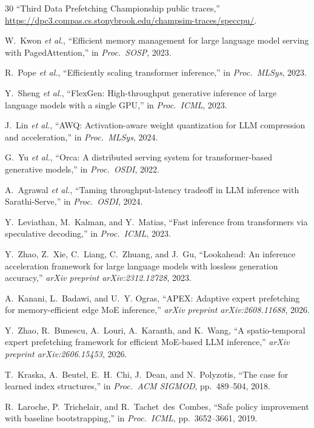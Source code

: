 \documentclass[conference]{IEEEtran}
\begin{document}
\begin{thebibliography}{30}
``Third Data Prefetching Championship public traces,''
\url{https://dpc3.compas.cs.stonybrook.edu/champsim-traces/speccpu/}.

W.~Kwon \emph{et al.},
``Efficient memory management for large language model serving with {PagedAttention},''
in \emph{Proc.\ SOSP}, 2023.

R.~Pope \emph{et al.},
``Efficiently scaling transformer inference,''
in \emph{Proc.\ MLSys}, 2023.

Y.~Sheng \emph{et al.},
``{FlexGen}: High-throughput generative inference of large language models with a single {GPU},''
in \emph{Proc.\ ICML}, 2023.

J.~Lin \emph{et al.},
``{AWQ}: Activation-aware weight quantization for {LLM} compression and acceleration,''
in \emph{Proc.\ MLSys}, 2024.

G.~Yu \emph{et al.},
``{Orca}: A distributed serving system for transformer-based generative models,''
in \emph{Proc.\ OSDI}, 2022.

A.~Agrawal \emph{et al.},
``Taming throughput-latency tradeoff in {LLM} inference with {Sarathi-Serve},''
in \emph{Proc.\ OSDI}, 2024.

Y.~Leviathan, M.~Kalman, and Y.~Matias,
``Fast inference from transformers via speculative decoding,''
in \emph{Proc.\ ICML}, 2023.

Y.~Zhao, Z.~Xie, C.~Liang, C.~Zhuang, and J.~Gu,
``Lookahead: An inference acceleration framework for large language models
with lossless generation accuracy,''
\emph{arXiv preprint arXiv:2312.12728}, 2023.

A.~Kanani, L.~Badawi, and U.~Y. Ogras,
``{APEX}: Adaptive expert prefetching for memory-efficient edge {MoE} inference,''
\emph{arXiv preprint arXiv:2608.11688}, 2026.

Y.~Zhao, R.~Bunescu, A.~Louri, A.~Karanth, and K.~Wang,
``A spatio-temporal expert prefetching framework for efficient {MoE}-based
{LLM} inference,''
\emph{arXiv preprint arXiv:2606.15453}, 2026.

T.~Kraska, A.~Beutel, E.~H.~Chi, J.~Dean, and N.~Polyzotis,
``The case for learned index structures,''
in \emph{Proc.\ ACM SIGMOD}, pp.~489--504, 2018.

R.~Laroche, P.~Trichelair, and R.~Tachet~des~Combes,
``Safe policy improvement with baseline bootstrapping,''
in \emph{Proc.\ ICML}, pp.~3652--3661, 2019.


\end{thebibliography}
\end{document}
